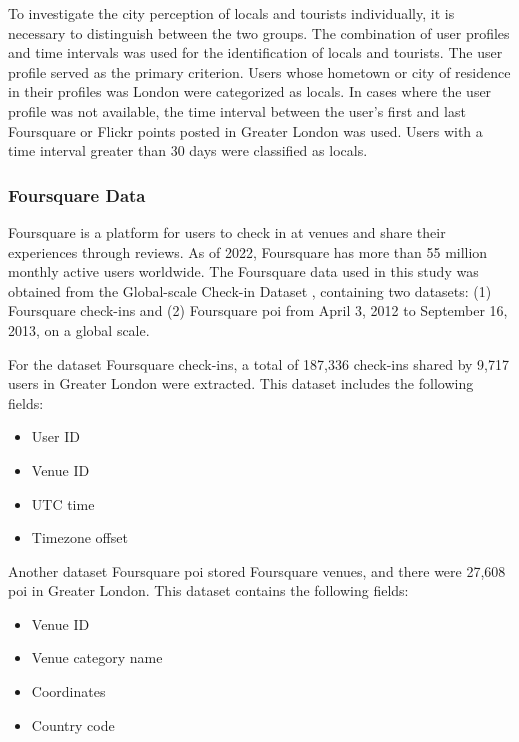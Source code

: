 \documentclass{article}
\begin{document}
To investigate the city perception of locals and tourists individually, it is necessary to distinguish between the two groups. The combination of user profiles and time intervals was used for the identification of locals and tourists. The user profile served as the primary criterion. Users whose hometown or city of residence in their profiles was London were categorized as locals. In cases where the user profile was not available, the time interval between the user's first and last Foursquare or Flickr points posted in Greater London was used. Users with a time interval greater than 30 days were classified as locals.

\subsubsection{Foursquare Data}
Foursquare is a platform for users to check in at venues and share their experiences through reviews. As of 2022, Foursquare has more than 55 million monthly active users worldwide. The Foursquare data used in this study was obtained from the Global-scale Check-in Dataset \cite{yang_nationtelescope_2015}, containing two datasets: (1) Foursquare check-ins and (2) Foursquare \acrshort{poi} from April 3, 2012 to September 16, 2013, on a global scale.

For the dataset Foursquare check-ins, a total of 187,336 check-ins shared by 9,717 users in Greater London were extracted. This dataset includes the following fields:
\begin{itemize}
    \item User ID
    \item Venue ID
    \item UTC time
    \item Timezone offset
\end{itemize}

Another dataset Foursquare \acrshort{poi} stored Foursquare venues, and there were 27,608 \acrshort{poi} in Greater London. This dataset contains the following fields:
\begin{itemize}
    \item Venue ID
    \item Venue category name
    \item Coordinates
    \item Country code
\end{itemize}
\end{document}
